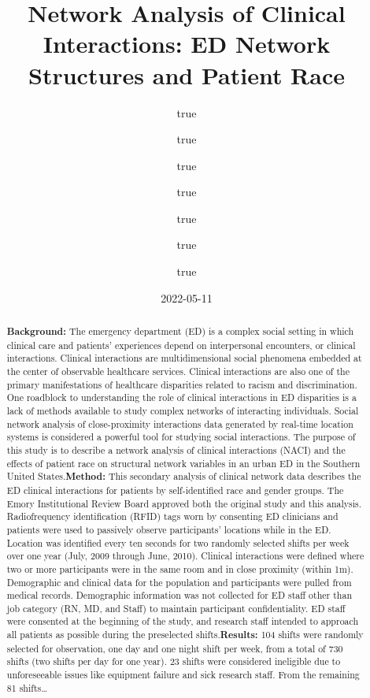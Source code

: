 \documentclass[
]{article}
\title{Network Analysis of Clinical Interactions: ED Network Structures
and Patient Race}
\author{true \and true \and true \and true \and true \and true \and true}
\date{2022-05-11}
\begin{document}
\maketitle
\begin{abstract}
\textbf{Background:} The emergency department (ED) is a complex social
setting in which clinical care and patients' experiences depend on
interpersonal encounters, or clinical interactions. Clinical
interactions are multidimensional social phenomena embedded at the
center of observable healthcare services. Clinical interactions are also
one of the primary manifestations of healthcare disparities related to
racism and discrimination. One roadblock to understanding the role of
clinical interactions in ED disparities is a lack of methods available
to study complex networks of interacting individuals. Social network
analysis of close-proximity interactions data generated by real-time
location systems is considered a powerful tool for studying social
interactions. The purpose of this study is to describe a network
analysis of clinical interactions (NACI) and the effects of patient race
on structural network variables in an urban ED in the Southern United
States.\textbf{Method:} This secondary analysis of clinical network data
describes the ED clinical interactions for patients by self-identified
race and gender groups. The Emory Institutional Review Board approved
both the original study and this analysis. Radiofrequency identification
(RFID) tags worn by consenting ED clinicians and patients were used to
passively observe participants' locations while in the ED. Location was
identified every ten seconds for two randomly selected shifts per week
over one year (July, 2009 through June, 2010). Clinical interactions
were defined where two or more participants were in the same room and in
close proximity (within 1m). Demographic and clinical data for the
population and participants were pulled from medical records.
Demographic information was not collected for ED staff other than job
category (RN, MD, and Staff) to maintain participant confidentiality. ED
staff were consented at the beginning of the study, and research staff
intended to approach all patients as possible during the preselected
shifts.\textbf{Results:} 104 shifts were randomly selected for
observation, one day and one night shift per week, from a total of 730
shifts (two shifts per day for one year). 23 shifts were considered
ineligible due to unforeseeable issues like equipment failure and sick
research staff. From the remaining 81 shifts\ldots{}
\end{abstract}
\end{document}
